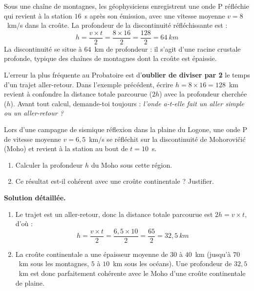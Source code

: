 \documentclass[11pt]{article}
\begin{document}
\begin{exemplebox}
Sous une chaîne de montagnes, les géophysiciens enregistrent une onde P réfléchie qui revient à la station $16$~s après son émission, avec une vitesse moyenne $v = 8$~km/s dans la croûte. La profondeur de la discontinuité réfléchissante est :
\[ h = \frac{v \times t}{2} = \frac{8 \times 16}{2} = \frac{128}{2} = 64~\si{km} \]
La discontinuité se situe à $64$~km de profondeur : il s'agit d'une racine crustale profonde, typique des chaînes de montagnes dont la croûte est épaissie.
\end{exemplebox}

\begin{attention}
L'erreur la plus fréquente au Probatoire est d'\textbf{oublier de diviser par 2} le temps d'un trajet aller-retour. Dans l'exemple précédent, écrire $h = 8 \times 16 = 128$~km revient à confondre la distance totale parcourue ($2h$) avec la profondeur cherchée ($h$). Avant tout calcul, demande-toi toujours : \emph{l'onde a-t-elle fait un aller simple ou un aller-retour ?}
\end{attention}

\begin{exoresolu}
Lors d'une campagne de sismique réflexion dans la plaine du Logone, une onde P de vitesse moyenne $v = 6{,}5$~km/s se réfléchit sur la discontinuité de Mohorovičić (Moho) et revient à la station au bout de $t = 10$~s.
\begin{enumerate}
\item Calculer la profondeur $h$ du Moho sous cette région.
\item Ce résultat est-il cohérent avec une croûte continentale ? Justifier.
\end{enumerate}
\tcblower
\textbf{Solution détaillée.}
\begin{enumerate}
\item Le trajet est un aller-retour, donc la distance totale parcourue est $2h = v \times t$, d'où :
\[ h = \frac{v \times t}{2} = \frac{6{,}5 \times 10}{2} = \frac{65}{2} = 32{,}5~\si{km} \]
\item La croûte continentale a une épaisseur moyenne de $30$ à $40$~km (jusqu'à $70$~km sous les montagnes, $5$ à $10$~km sous les océans). Une profondeur de $32{,}5$~km est donc parfaitement cohérente avec le Moho d'une croûte continentale de plaine.
\end{enumerate}
\end{exoresolu}
\end{document}
